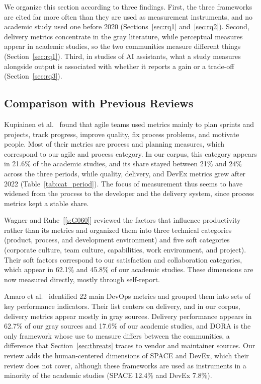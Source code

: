 \documentclass[preprint,number]{elsarticle}
\newcounter{study}
\newcommand{\refG}[1]{\ref{s:#1}}
\begin{document}
We organize this section according to three findings. First, the three frameworks are cited far more often than they are used as measurement instruments, and no academic study used one before 2020 (Sections~\ref{sec:rq1} and~\ref{sec:rq2}). Second, delivery metrics concentrate in the gray literature, while perceptual measures appear in academic studies, so the two communities measure different things (Section~\ref{sec:rq1}). Third, in studies of AI assistants, what a study measures alongside output is associated with whether it reports a gain or a trade-off (Section~\ref{sec:rq3}).

\subsection{Comparison with Previous Reviews}

Kupiainen et al.~\cite{kupiainen2015metrics} found that agile teams used metrics mainly to plan sprints and projects, track progress, improve quality, fix process problems, and motivate people. Most of their metrics are process and planning measures, which correspond to our agile and process category. In our corpus, this category appears in 21.6\% of the academic studies, and its share stayed between 21\% and 24\% across the three periods, while quality, delivery, and DevEx metrics grew after 2022 (Table~\ref{tab:cat_period}). The focus of measurement thus seems to have widened from the process to the developer and the delivery system, since process metrics kept a stable share.

Wagner and Ruhe~[\refG{G060}] reviewed the factors that influence productivity rather than its metrics and organized them into three technical categories (product, process, and development environment) and five soft categories (corporate culture, team culture, capabilities, work environment, and project). Their soft factors correspond to our satisfaction and collaboration categories, which appear in 62.1\% and 45.8\% of our academic studies. These dimensions are now measured directly, mostly through self-report.

Amaro et al.~\cite{amaro2024devops} identified 22 main DevOps metrics and grouped them into sets of key performance indicators. Their list centers on delivery, and in our corpus, delivery metrics appear mostly in gray sources. Delivery performance appears in 62.7\% of our gray sources and 17.6\% of our academic studies, and DORA is the only framework whose use to measure differs between the communities, a difference that Section~\ref{sec:threats} traces to vendor and maintainer sources. Our review adds the human-centered dimensions of SPACE and DevEx, which their review does not cover, although these frameworks are used as instruments in a minority of the academic studies (SPACE 12.4\% and DevEx 7.8\%).
\end{document}
